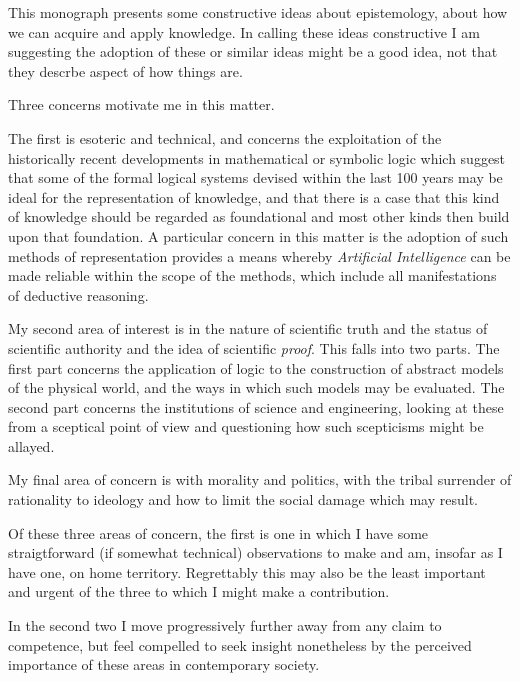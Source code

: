 ﻿This monograph presents some constructive ideas about epistemology, about how we can acquire and apply knowledge.
In calling these ideas constructive I am suggesting the adoption of these or similar ideas might be a good idea, not that they descrbe aspect of how things are.

Three concerns motivate me in this matter.

The first is esoteric and technical, and concerns the exploitation of the historically recent developments in mathematical or symbolic logic which suggest that some of the formal logical systems devised within the last 100 years may be ideal for the representation of knowledge, and that there is a case that this kind of knowledge should be regarded as foundational and most other kinds then build upon that foundation.
A particular concern in this matter is the adoption of such methods of representation provides a means whereby \emph{Artificial Intelligence} can be made reliable within the scope of the methods, which include all manifestations of deductive reasoning.

My second area of interest is in the nature of scientific truth and the status of scientific authority and the idea of scientific \emph{proof}.
This falls into two parts.
The first part concerns the application of logic to the construction of abstract models of the physical world, and the ways in which such models may be evaluated.
The second part concerns the institutions of science and engineering, looking at these from a sceptical point of view and questioning how such scepticisms might be allayed.

My final area of concern is with morality and politics, with the tribal surrender of rationality to ideology and how to limit the social damage which may result.

Of these three areas of concern, the first is one in which I have some straigtforward (if somewhat technical) observations to make and am, insofar as I have one, on home territory.
Regrettably this may also be the least important and urgent of the three to which I might make a contribution.

In the second two I move progressively further away from any claim to competence, but feel compelled to seek insight nonetheless by the perceived importance of these areas in contemporary society.

